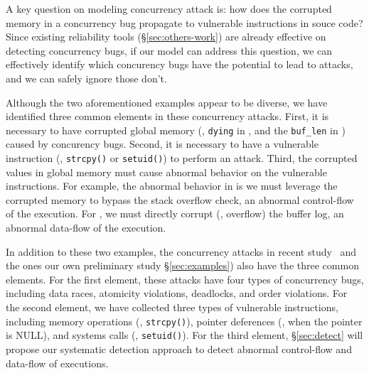 A key question on modeling concurrency attack is: how does the corrupted memory 
in a concurrency bug propagate to vulnerable instructions in souce code? Since 
existing reliability tools (\S\ref{sec:others-work}) are already effective on 
detecting concurrency bugs, if our model can address this question, we can 
effectively identify which concurency bugs have the potential to lead to 
attacks, and we can safely ignore those don't.

Although the two aforementioned examples appear to be diverse, we have 
identified three common elements in these concurrency attacks. First, it is 
necessary to have corrupted global memory (\eg, \texttt{dying} in \libsafe, and 
the \texttt{buf\_len} in \apache) caused by concurency bugs. Second, it is 
necessary to have a vulnerable instruction (\eg, \texttt{strcpy()} or 
\texttt{setuid()}) to perform an attack. Third, the corrupted values in global 
memory must cause abnormal behavior on the vulnerable instructions. For 
example, the abnormal behavior in \libsafe is we must leverage the corrupted 
memory to bypass the stack overflow check, an abnormal control-flow of the 
execution. For \apache, we must directly corrupt (\ie, overflow) the buffer 
log, an abnormal data-flow of the execution.

% 
In addition to these two examples, the \nattacks concurrency attacks in recent 
study~\cite{con:hotpar12} and the \noldattacks ones our own preliminary study 
\S\ref{sec:examples}) also have the three common elements. For the first 
element, these attacks have four types of concurrency bugs, including data 
races, atomicity violations, deadlocks, and order violations. For the second 
element, we have collected three types of vulnerable instructions, including 
memory operations (\eg, \texttt{strcpy()}), pointer deferences (\eg, when the 
pointer is NULL), and systems calls (\eg, \texttt{setuid()}). For the third 
element, \S\ref{sec:detect} will propose our systematic detection 
approach to detect abnormal control-flow and data-flow of executions.

